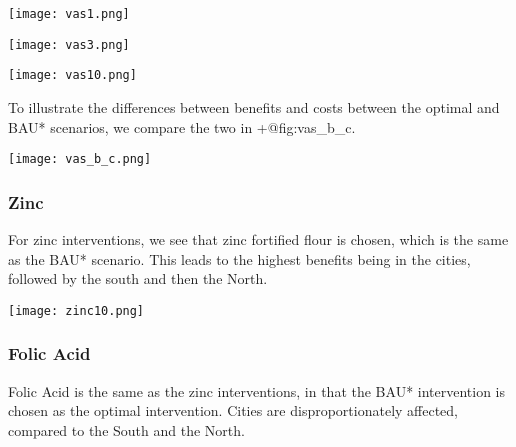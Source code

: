 \documentclass[
]{article}
\let\origfigure=\figure
\let\endorigfigure=\endfigure
\renewenvironment{figure}[1][]{%
    \origfigure[H]
}{%
    \endorigfigure
}
\begin{document}
\begin{figure}
\hypertarget{fig:vas1}{%
\centering
\texttt{[image: vas1.png]}
\caption{Vitamin A Accumulated Benefits, T=1}\label{fig:vas1}
}
\end{figure}

\begin{figure}
\hypertarget{fig:vas3}{%
\centering
\texttt{[image: vas3.png]}
\caption{Vitamin A Accumulated Benefits, T=3}\label{fig:vas3}
}
\end{figure}

\begin{figure}
\hypertarget{fig:vas10}{%
\centering
\texttt{[image: vas10.png]}
\caption{Vitamin A Accumulated Benefits, T=10}\label{fig:vas10}
}
\end{figure}

To illustrate the differences between benefits and costs between the
optimal and BAU* scenarios, we compare the two in +@fig:vas\_b\_c.

\begin{figure}
\hypertarget{fig:vas_b_c}{%
\centering
\texttt{[image: vas\_b\_c.png]}
\caption{Vitamin A Per-year Benefits and Costs across
Time}\label{fig:vas_b_c}
}
\end{figure}

\hypertarget{zinc}{%
\subsubsection{Zinc}\label{zinc}}

For zinc interventions, we see that zinc fortified flour is chosen,
which is the same as the BAU* scenario. This leads to the highest
benefits being in the cities, followed by the south and then the North.

\begin{figure}
\hypertarget{fig:zinc10}{%
\centering
\texttt{[image: zinc10.png]}
\caption{Zinc Accumulated Benefits, T=10}\label{fig:zinc10}
}
\end{figure}

\hypertarget{folic-acid}{%
\subsubsection{Folic Acid}\label{folic-acid}}

Folic Acid is the same as the zinc interventions, in that the BAU*
intervention is chosen as the optimal intervention. Cities are
disproportionately affected, compared to the South and the North.
\end{document}
